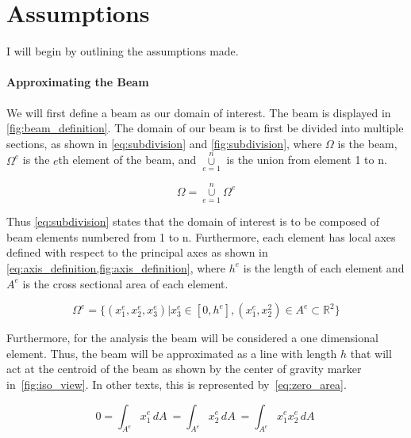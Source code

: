 \section{Assumptions}

I will begin by outlining the assumptions made.

\paragraph{Approximating the Beam}
 We will first define a beam as our domain of interest.
The beam is displayed in \cref{fig:beam_definition}.
The domain of our beam is to first be divided into multiple sections, as shown in \cref{eq:subdivision} and \cref{fig:subdivision}, where 
$\Omega$ is the beam,
$\Omega^e$  is the $e$th element of the beam, and
$\overset{n}{\underset{e=1}{\cup}}$ is the union from element 1 to n.

\begin{equation}
 \Omega = \overset{n}{\underset{e=1}{\cup}} \Omega^e
 \label{eq:subdivision}
 \end{equation}


Thus \cref{eq:subdivision} states that the domain of interest is to be composed of beam elements numbered from 1 to n.
Furthermore, each element has local axes defined with respect to the principal axes as shown in \cref{eq:axis_definition,fig:axis_definition}, where $h^e$ is the length of each element and $A^e$ is the cross sectional area of each element.

\begin{equation}
\Omega^e = \{
(x_1^e, x_2^e, x_3^e)
|x_3^e 
\in 
[0,h^e], 
(x_1^e, x_2^2) 
\in
A^e 
\subset
\mathbb{R}^2 
\}
\label{eq:axis_definition}
\end{equation}

Furthermore, for the analysis the beam will be considered a one dimensional element. 
Thus, the beam will be approximated as a line with length $h$ that will act at the centroid of the beam as shown by the center of gravity marker in~\cref{fig:iso_view}.
In other texts, this is represented by~\cref{eq:zero_area}.

\begin{equation}
0 =
\int_{A^e} x_1^e \,dA \  =
\int_{A^e} x_2^e \,dA \ =
\int_{A^e} x_1^e x_2^e \,dA \
\label{eq:zero_area}
\end{equation}

